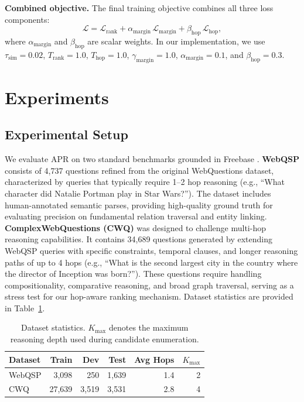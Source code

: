 \documentclass[conference]{IEEEtran}
\newcommand{\model}{\textsc{APR}}
\begin{document}
\textbf{Combined objective.} The final training objective combines all three loss components:
\begin{equation}
\label{eq:total-loss}
\mathcal{L}=\mathcal{L}_{\text{rank}}+\alpha_{\text{margin}}\,\mathcal{L}_{\text{margin}}+\beta_{\text{hop}}\,\mathcal{L}_{\text{hop}},
\end{equation}
where $\alpha_{\text{margin}}$ and $\beta_{\text{hop}}$ are scalar weights. In our implementation, we use $\tau_{\text{sim}}=0.02$, $T_{\text{rank}}=1.0$, $T_{\text{hop}}=1.0$, $\gamma_{\text{margin}}=1.0$, $\alpha_{\text{margin}}=0.1$, and $\beta_{\text{hop}}=0.3$.

\section{Experiments}

\subsection{Experimental Setup}

We evaluate \model{} on two standard benchmarks grounded in Freebase \cite{bollacker2008freebase}. \textbf{WebQSP} \cite{yih2016webqsp} consists of 4,737 questions refined from the original WebQuestions dataset, characterized by queries that typically require 1--2 hop reasoning (e.g., “What character did Natalie Portman play in Star Wars?”). The dataset includes human-annotated semantic parses, providing high-quality ground truth for evaluating precision on fundamental relation traversal and entity linking. \textbf{ComplexWebQuestions (CWQ)} \cite{talmor2018cwq} was designed to challenge multi-hop reasoning capabilities. It contains 34,689 questions generated by extending WebQSP queries with specific constraints, temporal clauses, and longer reasoning paths of up to 4 hops (e.g., “What is the second largest city in the country where the director of Inception was born?”). These questions require handling compositionality, comparative reasoning, and broad graph traversal, serving as a stress test for our hop-aware ranking mechanism. Dataset statistics are provided in Table~\ref{tab:datasets}.

\begin{table}[t]
\centering
\caption{Dataset statistics. $K_{\text{max}}$ denotes the maximum reasoning depth used during candidate enumeration.}
\label{tab:datasets}
\begin{tabular}{lrrrrr}
\toprule
Dataset & Train & Dev & Test & Avg Hops & $K_{\text{max}}$ \\
\midrule
WebQSP & 3,098 & 250 & 1,639 & 1.4 & 2 \\
CWQ & 27,639 & 3,519 & 3,531 & 2.8 & 4 \\
\bottomrule
\end{tabular}
\end{table}
\end{document}
